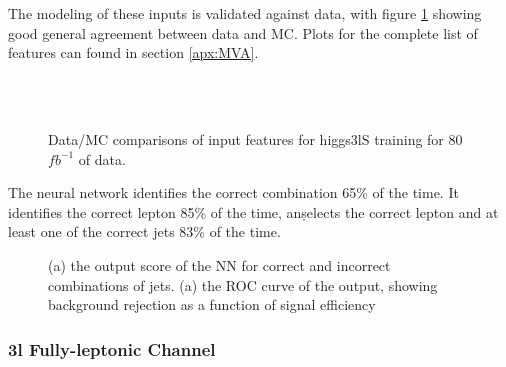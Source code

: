The modeling of these inputs is validated against data, with figure \ref{fig:model_higgs3lS} showing good general agreement between data and MC. Plots for the complete list of features can found in section \ref{apx:MVA}.

\begin{figure}[h!]
    \\
    \\
    \caption{Data/MC comparisons of input features for higgs3lS training for 80 $fb^{-1}$ of data.}
    \label{fig:model_higgs3lS}
\end{figure} 

The neural network identifies the correct combination 65\% of the time. It identifies the correct lepton 85\% of the time, an\d selects the correct lepton and at least one of the correct jets 83\% of the time.

\begin{figure}[h!]
  \label{fig:higgs3lSresults}
  \caption{(a) the output score of the NN for correct and incorrect combinations of jets. (a) the ROC curve of the output, showing background rejection as a function of signal efficiency}
\end{figure} 


\subsubsection{3l Fully-leptonic Channel}
\label{subsec:higgs3lF}


